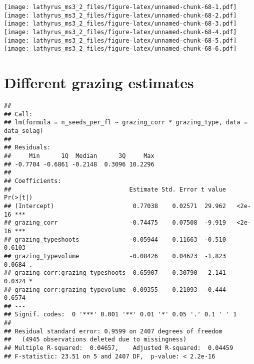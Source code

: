 \documentclass[
]{article}
\newenvironment{Shaded}{\begin{snugshade}}{\end{snugshade}}
\newcommand{\DecValTok}[1]{\textcolor[rgb]{0.00,0.00,0.81}{#1}}
\newcommand{\KeywordTok}[1]{\textcolor[rgb]{0.13,0.29,0.53}{\textbf{#1}}}
\newcommand{\NormalTok}[1]{#1}
\newcommand{\OperatorTok}[1]{\textcolor[rgb]{0.81,0.36,0.00}{\textbf{#1}}}
\newcommand{\StringTok}[1]{\textcolor[rgb]{0.31,0.60,0.02}{#1}}
\begin{document}
\texttt{[image: lathyrus\_ms3\_2\_files/figure-latex/unnamed-chunk-68-1.pdf]}
\texttt{[image: lathyrus\_ms3\_2\_files/figure-latex/unnamed-chunk-68-2.pdf]}
\texttt{[image: lathyrus\_ms3\_2\_files/figure-latex/unnamed-chunk-68-3.pdf]}
\texttt{[image: lathyrus\_ms3\_2\_files/figure-latex/unnamed-chunk-68-4.pdf]}
\texttt{[image: lathyrus\_ms3\_2\_files/figure-latex/unnamed-chunk-68-5.pdf]}
\texttt{[image: lathyrus\_ms3\_2\_files/figure-latex/unnamed-chunk-68-6.pdf]}

\hypertarget{different-grazing-estimates}{%
\section{Different grazing
estimates}\label{different-grazing-estimates}}

\begin{Shaded}
\end{Shaded}

\begin{verbatim}
## 
## Call:
## lm(formula = n_seeds_per_fl ~ grazing_corr * grazing_type, data = data_selag)
## 
## Residuals:
##     Min      1Q  Median      3Q     Max 
## -0.7704 -0.6861 -0.2148  0.3096 10.2296 
## 
## Coefficients:
##                                 Estimate Std. Error t value Pr(>|t|)    
## (Intercept)                      0.77038    0.02571  29.962   <2e-16 ***
## grazing_corr                    -0.74475    0.07508  -9.919   <2e-16 ***
## grazing_typeshoots              -0.05944    0.11663  -0.510   0.6103    
## grazing_typevolume              -0.08426    0.04623  -1.823   0.0684 .  
## grazing_corr:grazing_typeshoots  0.65907    0.30790   2.141   0.0324 *  
## grazing_corr:grazing_typevolume -0.09355    0.21093  -0.444   0.6574    
## ---
## Signif. codes:  0 '***' 0.001 '**' 0.01 '*' 0.05 '.' 0.1 ' ' 1
## 
## Residual standard error: 0.9599 on 2407 degrees of freedom
##   (4945 observations deleted due to missingness)
## Multiple R-squared:  0.04657,    Adjusted R-squared:  0.04459 
## F-statistic: 23.51 on 5 and 2407 DF,  p-value: < 2.2e-16
\end{verbatim}
\end{document}
